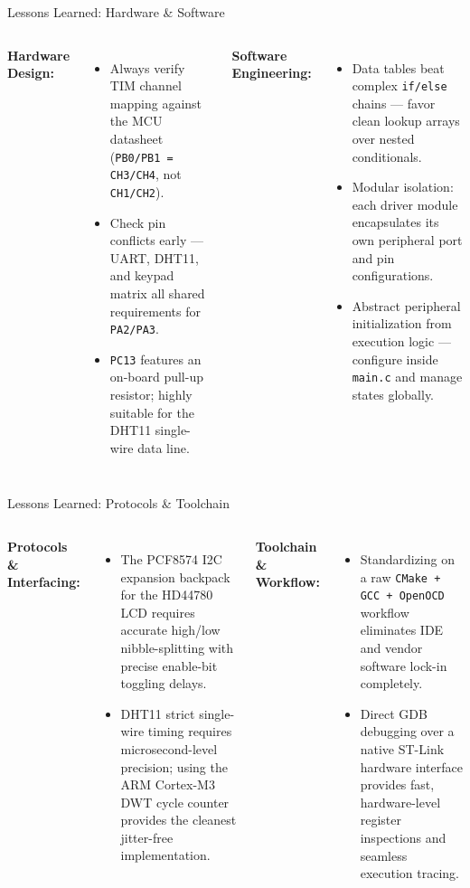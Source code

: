 \documentclass[10pt]{beamer}
\begin{document}
\begin{frame}{Lessons Learned: Hardware \& Software}
    \begin{columns}[t]
        \textbf{Hardware Design:}
        \begin{itemize}
            \item Always verify TIM channel mapping against the MCU datasheet (\texttt{PB0/PB1 = CH3/CH4}, not \texttt{CH1/CH2}).
            \item Check pin conflicts early --- UART, DHT11, and keypad matrix all shared requirements for \texttt{PA2/PA3}.
            \item \texttt{PC13} features an on-board pull-up resistor; highly suitable for the DHT11 single-wire data line.
        \end{itemize}

        \textbf{Software Engineering:}
        \begin{itemize}
            \item Data tables beat complex \texttt{if/else} chains --- favor clean lookup arrays over nested conditionals.
            \item Modular isolation: each driver module encapsulates its own peripheral port and pin configurations.
            \item Abstract peripheral initialization from execution logic --- configure inside \texttt{main.c} and manage states globally.
        \end{itemize}
    \end{columns}
\end{frame}

\begin{frame}{Lessons Learned: Protocols \& Toolchain}
    \begin{columns}[t]
        \textbf{Protocols \& Interfacing:}
        \begin{itemize}
            \item The PCF8574 I2C expansion backpack for the HD44780 LCD requires accurate high/low nibble-splitting with precise enable-bit toggling delays.
            \item DHT11 strict single-wire timing requires microsecond-level precision; using the ARM Cortex-M3 DWT cycle counter provides the cleanest jitter-free implementation.
        \end{itemize}

        \textbf{Toolchain \& Workflow:}
        \begin{itemize}
            \item Standardizing on a raw \texttt{CMake + GCC + OpenOCD} workflow eliminates IDE and vendor software lock-in completely.
            \item Direct GDB debugging over a native ST-Link hardware interface provides fast, hardware-level register inspections and seamless execution tracing.
        \end{itemize}
    \end{columns}
\end{frame}
\end{document}
